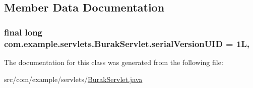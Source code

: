 \subsection{Member Data Documentation}
\subsubsection[{\texorpdfstring{serial\+Version\+U\+ID}{serialVersionUID}}]{\setlength{\rightskip}{0pt plus 5cm}final long com.\+example.\+servlets.\+Burak\+Servlet.\+serial\+Version\+U\+ID = 1L\hspace{0.3cm}{\ttfamily [static]}, {\ttfamily [private]}}\hypertarget{classcom_1_1example_1_1servlets_1_1_burak_servlet_a03b3133becc008e75537df6820aaef5c}{}\label{classcom_1_1example_1_1servlets_1_1_burak_servlet_a03b3133becc008e75537df6820aaef5c}


The documentation for this class was generated from the following file\+:\begin{DoxyCompactItemize}
\item 
src/com/example/servlets/\hyperlink{_burak_servlet_8java}{Burak\+Servlet.\+java}\end{DoxyCompactItemize}
